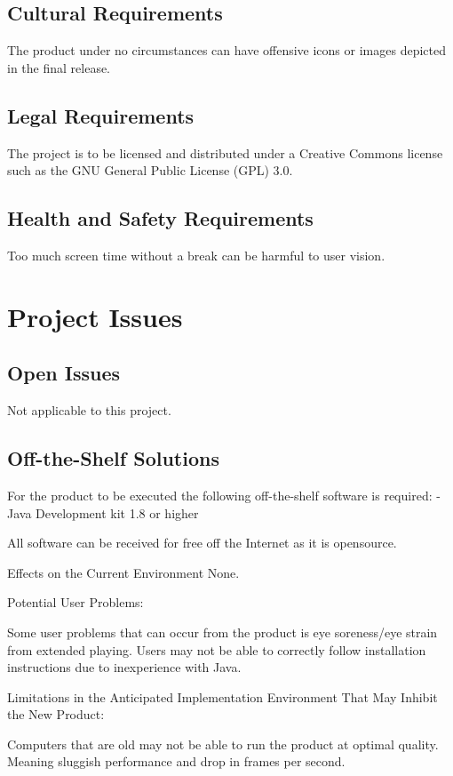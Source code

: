 \documentclass[12pt, titlepage]{article}
\begin{document}
\subsection{Cultural Requirements}
The product under no circumstances can have offensive icons or images depicted in the final release.

\subsection{Legal Requirements}
The project is to be licensed and distributed under a Creative Commons license such as the GNU General Public License (GPL) 3.0.

\subsection{Health and Safety Requirements}
Too much screen time without a break can be harmful to user vision. 

\section{Project Issues}
\subsection{Open Issues}
Not applicable to this project.

\subsection{Off-the-Shelf Solutions}
For the product to be executed the following off-the-shelf software is required: 
-Java Development kit 1.8 or higher

All software can be received for free off the Internet as it is opensource.

Effects on the Current Environment 
None.

Potential User Problems:

Some user problems that can occur from the product is eye soreness/eye strain from extended playing. Users may not be able to correctly follow installation instructions due to inexperience with Java.

Limitations in the Anticipated Implementation Environment That May Inhibit the New Product:

Computers that are old may not be able to run the product at optimal quality. Meaning sluggish performance and drop in frames per second.
\end{document}
